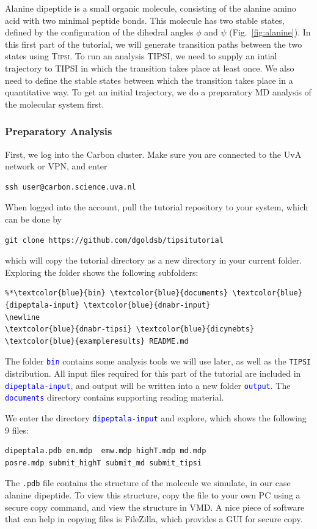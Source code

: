 \documentclass[]{article}
\begin{document}
Alanine dipeptide is a small organic molecule, consisting of the alanine amino acid with two minimal peptide bonds. This molecule has two stable states, defined by the configuration of the dihedral angles $\phi$ and $\psi$ (Fig.~\ref{fig:alanine}). In this first part of the tutorial, we will generate transition paths between the two states using \textsc{Tipsi}. To run an analysis \textsc{TIPSI}, we need to supply an intial trajectory to \textsc{TIPSI} in which the transition takes place at least once. We also need to define the stable states between which the transition takes place in a quantitative way. To get an initial trajectory, we do a preparatory MD analysis of the molecular system first.

\subsubsection*{Preparatory Analysis}

First, we log into the Carbon cluster. Make sure you are connected to the UvA network or VPN, and enter
%
\begin{lstlisting}
ssh user@carbon.science.uva.nl
\end{lstlisting}
%
When logged into the account, pull the tutorial repository to your system, which can be done by
%
\begin{lstlisting}
git clone https://github.com/dgoldsb/tipsitutorial
\end{lstlisting}
%
which will copy the tutorial directory as a new directory in your current folder. Exploring the folder shows the following subfolders:
%
\begin{lstlisting}
%*\textcolor{blue}{bin} \textcolor{blue}{documents} \textcolor{blue}{dipeptala-input} \textcolor{blue}{dnabr-input}
\newline
\textcolor{blue}{dnabr-tipsi} \textcolor{blue}{dicynebts} \textcolor{blue}{exampleresults} README.md
\end{lstlisting}
%
The folder \texttt{\textcolor{blue}{bin}} contains some analysis tools we will use later, as well as the \texttt{TIPSI} distribution. All input files required for this part of the tutorial are included in \texttt{\textcolor{blue}{dipeptala-input}}, and output will be written into a new folder \texttt{\textcolor{blue}{output}}. The \texttt{\textcolor{blue}{documents}} directory contains supporting reading material.

We enter the directory \texttt{\textcolor{blue}{dipeptala-input}} and explore, which shows the following 9 files:
%
\begin{lstlisting}
dipeptala.pdb em.mdp  emw.mdp highT.mdp md.mdp
posre.mdp submit_highT submit_md submit_tipsi
\end{lstlisting}
%
The \texttt{.pdb} file contains the structure of the molecule we simulate, in our case alanine dipeptide. To view this structure, copy the file to your own PC using a secure copy command, and view the structure in VMD. A nice piece of software that can help in copying files is FileZilla, which provides a GUI for secure copy.
\end{document}
